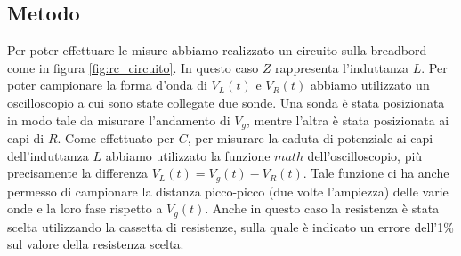 \documentclass[a4paper]{article}
\begin{document}
\subsection{Metodo}
Per poter effettuare le misure abbiamo realizzato un circuito sulla breadbord come in figura \ref{fig:rc_circuito}. In questo caso $Z$ rappresenta l'induttanza $L$. Per poter campionare la forma d'onda di $V_L(t)$ e $V_R (t)$ abbiamo utilizzato un oscilloscopio a cui sono state collegate due sonde. Una sonda è stata posizionata in modo tale da misurare l'andamento di $V_g$, mentre l'altra è stata posizionata ai capi di $R$. Come effettuato per $C$, per misurare la caduta di potenziale ai capi dell'induttanza $L$ abbiamo utilizzato la funzione $math$ dell'oscilloscopio, più precisamente la differenza $V_L(t)=V_g(t)-V_R(t)$. Tale funzione ci ha anche permesso di campionare la distanza picco-picco (due volte l'ampiezza) delle varie onde e la loro fase rispetto a $V_g (t)$. Anche in questo caso la resistenza è stata scelta utilizzando la cassetta di resistenze, sulla quale è indicato un errore dell'1\% sul valore della resistenza scelta. 
\end{document}
